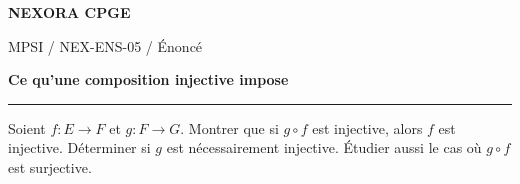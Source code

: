 \documentclass[11pt,a4paper]{article}
\begin{document}
{\small\bfseries\color{nexorablue} NEXORA CPGE}\par
{\small MPSI / NEX-ENS-05 / Énoncé}\par
{\LARGE\bfseries Ce qu’une composition injective impose}\par
\vspace{0.25em}\hrule\vspace{0.6em}

Soient $f:E\to F$ et $g:F\to G$. Montrer que si $g\circ f$ est injective, alors $f$ est injective. Déterminer si $g$ est nécessairement injective. Étudier aussi le cas où $g\circ f$ est surjective.
\end{document}
